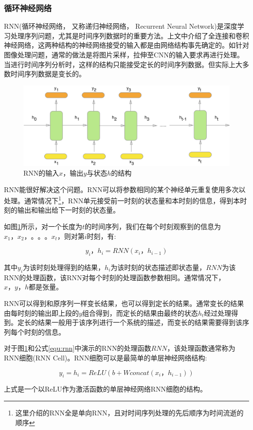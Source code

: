 \subsubsection{循环神经网络} \label{section:rnn}
RNN(循环神经网络， 又称递归神经网络， Recurrent Neural Network)是深度学习处理序列问题，尤其是时间序列数据时的重要方法。上文中介绍了全连接和卷积神经网络，这两种结构的神经网络接受的输入都是由网络结构事先确定的。如针对图像处理问题，通常的做法是将图片采样，拉伸至CNN的输入要求再进行处理。当进行时间序列分析时，这样的结构只能接受定长的时间序列数据。但实际上大多数时间序列数据是变长的。
\par
\begin{figure}[htbp!]
    \centering
    \includegraphics[width = 1.\textwidth]{chap/img/rnn.png}
    \caption{
        RNN的输入$x$，输出$y$与状态$h$的结构\supercite{how_rnn_work}
        }\label{fig:rnn}
\end{figure}
\par
RNN能很好解决这个问题。RNN可以将参数相同的某个神经单元重复使用多次以处理。通常情况下\footnote{这里介绍的RNN全是单向RNN，且对时间序列处理的先后顺序为时间流逝的顺序}，RNN单元接受前一时刻的状态量和本时刻的信息，得到本时刻的输出和输出给下一时刻的状态量。
\par
如图\ref{fig:rnn}所示，对一个长度为$t$的时间序列，我们在每个时刻观察到的信息为$x_1， x_2， 。。。x_t$，则对第$i$时刻，有:
\par
\begin{equation} \label{equ:rnn} y_i，h_i = RNN(x_i， h_{i-1})  \end{equation}
\par
其中$y_i$为该时刻处理得到的结果，$h_i$为该时刻的状态描述即状态量，$RNN$为该RNN的处理函数，该RNN对每个时刻的处理函数参数相同。通常情况下，$x，y，h$都是张量。
\par
RNN可以得到和原序列一样变长结果，也可以得到定长的结果。通常变长的结果由每时刻的输出即上段的$y$组合得到，而定长的结果由最终的状态$h_t$经过处理得到。定长的结果一般用于该序列进行一个系统的描述，而变长的结果需要得到该序列每个时刻的信息。
\par
对于图\ref{fig:rnn}和公式\ref{equ:rnn}中演示的RNN的处理函数$RNN$，该处理函数通常称为RNN细胞(RNN Cell)。RNN细胞可以是最简单的单层神经网络结构:
\par
\begin{equation} \label{equ:simple_rnn} y_i = h_i = ReLU(b + W concat(x_i， h_{i-1}))  \end{equation}
\par
上式是一个以ReLU作为激活函数的单层神经网络RNN细胞的结构。
\par

